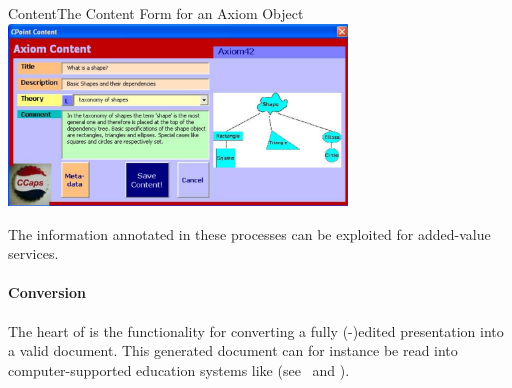 \begin{myfig}{Content}{The {\cpoint} Content Form for an Axiom Object}
  \includegraphics[width=9cm]{projects/cpoint/CPointContent}
\end{myfig}
The information annotated in these processes can be exploited for
added-value services.

\paragraph{{\omdoc} Conversion}\label{sec:omdocize} The heart of {\cpoint} is the
functionality for converting a fully ({\cpoint}-)edited presentation into a valid {\omdoc}
document.  This generated {\omdoc} document can for instance be read into
computer-supported education systems like {\activemath} (see~\cite{activemathAIEDJ01} and
{}).

